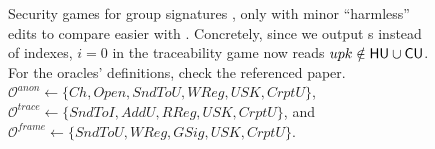 \begin{figure}[ht!]
  \centering
  \caption{Security games for group signatures \cite{bsz05}, only with minor    
    ``harmless'' edits to compare easier with \CUASGS. Concretely, since we
    output {\upk}s instead of indexes, $i=0$ in the traceability game now reads
    $upk \notin \mathsf{HU} \cup \mathsf{CU}$. For the oracles' definitions, check the
    referenced paper.
    $\mathcal{O}^{anon} \gets \lbrace Ch,Open,SndToU,WReg,USK,CrptU \rbrace$,
    $\mathcal{O}^{trace} \gets \lbrace SndToI,AddU,RReg,USK,CrptU \rbrace$,
    and $\mathcal{O}^{frame} \gets \lbrace SndToU,WReg,GSig,USK,CrptU \rbrace$.
  }
  \label{fig:model-gs}  
\end{figure}

